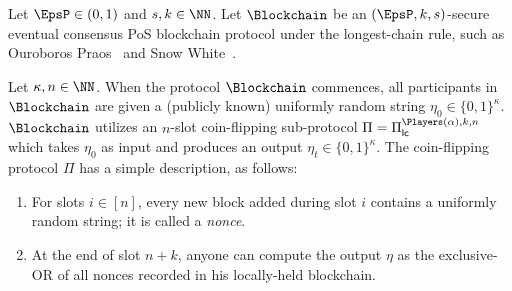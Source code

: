 
\newcommand{\Suffix}[2]{ \mathsf{suffix}({#1},{#2})}
\newcommand{\CoinTossingLC}{\Pi_\mathsf{lc}^{\Players(\alpha),k,n}}

Let $\EpsP \in (0,1)$ and $s, k \in \NN$. 
Let $\Blockchain$ be an $(\EpsP, k, s)$-secure eventual consensus PoS blockchain protocol 
under the longest-chain rule, such as 
Ouroboros Praos~\cite{Praos} and Snow White~\cite{SnowWhite}.

Let $\kappa, n \in \NN$.
When the protocol $\Blockchain$ commences, 
all participants in $\Blockchain$ are given a 
(publicly known) uniformly random string $\eta_0 \in \{0,1\}^\kappa$. 
$\Blockchain$ utilizes an $n$-slot 
coin-flipping sub-protocol $\Pi = \CoinTossingLC$ 
which takes $\eta_0$ as input 
and produces an output $\eta_{t} \in \{0,1\}^\kappa$. 
The coin-flipping protocol $\Pi$ has a simple description, as follows:
\begin{enumerate}
  \item For slots $i \in [n]$, 
  every new block added during slot $i$ contains a uniformly random string; 
  it is called a \emph{nonce}.

  \item At the end of slot $n + k$, 
  anyone can compute the output $\eta$
  as the exclusive-OR of all nonces recorded in his locally-held blockchain. 
\end{enumerate}

